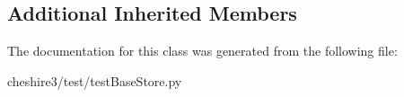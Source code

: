 \subsection*{Additional Inherited Members}


The documentation for this class was generated from the following file\-:\begin{DoxyCompactItemize}
\item 
cheshire3/test/test\-Base\-Store.\-py\end{DoxyCompactItemize}
